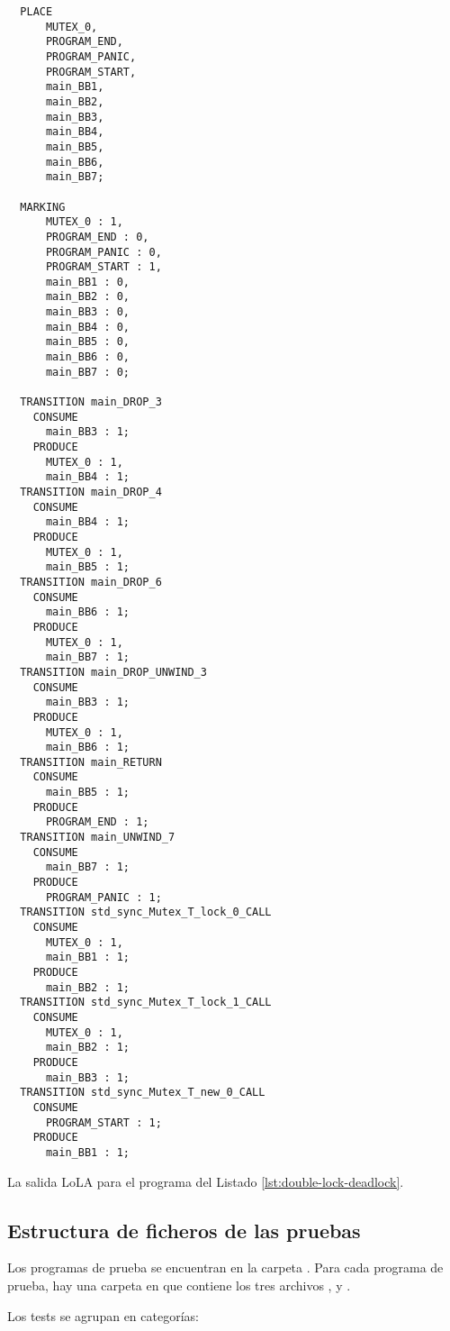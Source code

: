 \begin{longlisting}
  \begin{verbatim}
  PLACE
      MUTEX_0,
      PROGRAM_END,
      PROGRAM_PANIC,
      PROGRAM_START,
      main_BB1,
      main_BB2,
      main_BB3,
      main_BB4,
      main_BB5,
      main_BB6,
      main_BB7;
  
  MARKING
      MUTEX_0 : 1,
      PROGRAM_END : 0,
      PROGRAM_PANIC : 0,
      PROGRAM_START : 1,
      main_BB1 : 0,
      main_BB2 : 0,
      main_BB3 : 0,
      main_BB4 : 0,
      main_BB5 : 0,
      main_BB6 : 0,
      main_BB7 : 0;
  
  TRANSITION main_DROP_3
    CONSUME
      main_BB3 : 1;
    PRODUCE
      MUTEX_0 : 1,
      main_BB4 : 1;
  TRANSITION main_DROP_4
    CONSUME
      main_BB4 : 1;
    PRODUCE
      MUTEX_0 : 1,
      main_BB5 : 1;
  TRANSITION main_DROP_6
    CONSUME
      main_BB6 : 1;
    PRODUCE
      MUTEX_0 : 1,
      main_BB7 : 1;
  TRANSITION main_DROP_UNWIND_3
    CONSUME
      main_BB3 : 1;
    PRODUCE
      MUTEX_0 : 1,
      main_BB6 : 1;
  TRANSITION main_RETURN
    CONSUME
      main_BB5 : 1;
    PRODUCE
      PROGRAM_END : 1;
  TRANSITION main_UNWIND_7
    CONSUME
      main_BB7 : 1;
    PRODUCE
      PROGRAM_PANIC : 1;
  TRANSITION std_sync_Mutex_T_lock_0_CALL
    CONSUME
      MUTEX_0 : 1,
      main_BB1 : 1;
    PRODUCE
      main_BB2 : 1;
  TRANSITION std_sync_Mutex_T_lock_1_CALL
    CONSUME
      MUTEX_0 : 1,
      main_BB2 : 1;
    PRODUCE
      main_BB3 : 1;
  TRANSITION std_sync_Mutex_T_new_0_CALL
    CONSUME
      PROGRAM_START : 1;
    PRODUCE
      main_BB1 : 1;    
  \end{verbatim}
  \caption{La salida LoLA para el programa del Listado \ref{lst:double-lock-deadlock}.}
  \label{lst:double-lock-deadlock-lola}
\end{longlisting}

\subsection{Estructura de ficheros de las pruebas}

Los programas de prueba se encuentran en la carpeta .
Para cada programa de prueba, hay una carpeta en 
que contiene los tres archivos ,  y .

Los tests se agrupan en categorías:

